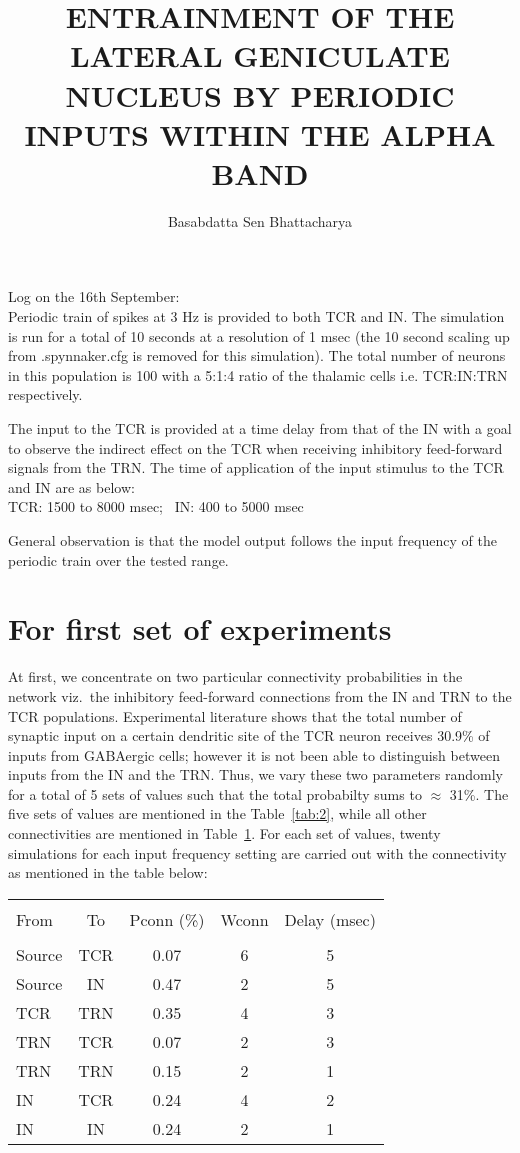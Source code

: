 \documentclass[11pt,a4paper]{article}
\author{Basabdatta Sen Bhattacharya}
\title{ENTRAINMENT OF THE LATERAL GENICULATE NUCLEUS BY PERIODIC INPUTS WITHIN THE ALPHA BAND}
\begin{document}
Log on the 16th September:\\
Periodic train of spikes at 3 Hz is provided to both TCR and IN. The simulation is run for a total of 10 seconds at a resolution of 1 msec (the 10 second scaling up from .spynnaker.cfg is removed for this simulation). The total number of neurons in this population is 100 with a 5:1:4 ratio of the thalamic cells i.e. TCR:IN:TRN respectively.

The input to the TCR is provided at a time delay from that of the IN with a goal to observe the indirect effect on the TCR when receiving inhibitory feed-forward signals from the TRN. The time of application of the input stimulus to the TCR and IN are as below:\\
TCR: 1500 to 8000 msec; \, IN: 400 to 5000 msec

General observation is that the model output follows the input frequency of the periodic train over the tested range.
\section{For first set of experiments}
\label{sec:1}
At first, we concentrate on two particular connectivity probabilities in the network viz.\ the inhibitory feed-forward connections from the IN and TRN to the TCR populations. Experimental literature shows that the total number of synaptic input on a certain dendritic site of the TCR neuron receives 30.9\% of inputs from GABAergic cells; however it is not been able to distinguish between inputs from the IN and the TRN. Thus, we vary these two parameters randomly for a total of 5 sets of values such that the total probabilty sums to $\approx$ 31\%. The five sets of values are mentioned in the Table~\ref{tab:2}, while all other connectivities are mentioned in Table~\ref{tab:1}. For each set of values, twenty simulations for each input frequency setting are carried out with the connectivity as mentioned in the table below:
\begin{table}
\begin{tabular}{||l|c|c|c|c||}
\hline \\
From & To & Pconn (\%) & Wconn & Delay (msec) \\
\hline \hline \\
Source & TCR & 0.07 & 6 & 5\\
Source & IN & 0.47 & 2 & 5 \\
TCR & TRN & 0.35 & 4 & 3 \\
TRN & TCR & 0.07 & 2 & 3 \\
TRN & TRN & 0.15 & 2 & 1 \\
IN & TCR & 0.24 & 4 & 2 \\
IN & IN & 0.24 & 2 & 1 \\
\hline \hline
\end{tabular}
\label{tab:1}
\end{table}
\end{document}
